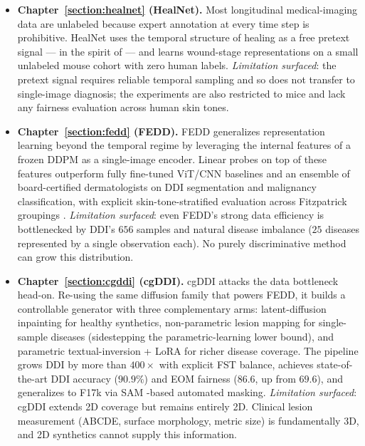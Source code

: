\documentclass[11pt]{ucthesis}
\begin{document}
\begin{itemize}
    \item \textbf{Chapter~\ref{section:healnet} (HealNet).} Most longitudinal medical-imaging data are unlabeled because expert annotation at every time step is prohibitive. HealNet uses the temporal structure of healing as a free pretext signal --- in the spirit of \cite{misra2016shuffle,bromley1993signature,yan2020clusterfit} --- and learns wound-stage representations on a small unlabeled mouse cohort \cite{carrion2021automatic} with zero human labels. \emph{Limitation surfaced}: the pretext signal requires reliable temporal sampling and so does not transfer to single-image diagnosis; the experiments are also restricted to mice and lack any fairness evaluation across human skin tones.
    \item \textbf{Chapter~\ref{section:fedd} (FEDD).} FEDD generalizes representation learning beyond the temporal regime by leveraging the internal features of a frozen DDPM \cite{Ho2020DenoisingDP,baranchuk_2022_labelefficient} as a single-image encoder. Linear probes on top of these features outperform fully fine-tuned ViT/CNN baselines and an ensemble of board-certified dermatologists on DDI segmentation and malignancy classification, with explicit skin-tone-stratified evaluation across Fitzpatrick groupings \cite{daneshjou_2022_disparities,fitzpatrick_1988_the}. \emph{Limitation surfaced}: even FEDD's strong data efficiency is bottlenecked by DDI's $656$ samples and natural disease imbalance ($25$ diseases represented by a single observation each). No purely discriminative method can grow this distribution.
    \item \textbf{Chapter~\ref{section:cgddi} (cgDDI).} cgDDI attacks the data bottleneck head-on. Re-using the same diffusion family that powers FEDD, it builds a controllable generator with three complementary arms: latent-diffusion inpainting for healthy synthetics, non-parametric lesion mapping for single-sample diseases (sidestepping the parametric-learning lower bound), and parametric textual-inversion + LoRA \cite{gal2023an,hu2022lora,ruiz-2023} for richer disease coverage. The pipeline grows DDI by more than $400\times$ with explicit FST balance, achieves state-of-the-art DDI accuracy ($90.9\%$) and EOM fairness ($86.6$, up from $69.6$), and generalizes to F17k via SAM \cite{Kirillov2023SegmentA,carion2025sam3segmentconcepts}-based automated masking. \emph{Limitation surfaced}: cgDDI extends 2D coverage but remains entirely 2D. Clinical lesion measurement (ABCDE, surface morphology, metric size) is fundamentally 3D, and 2D synthetics cannot supply this information.

\end{itemize}
\end{document}
